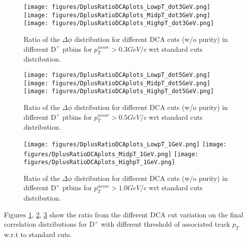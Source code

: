 \newpage
\begin{figure}[h]
\centering
{\texttt{[image: figures/DplusRatioDCAplots\_LowpT\_dot3GeV.png]}}
{\texttt{[image: figures/DplusRatioDCAplots\_MidpT\_dot3GeV.png]}}
{\texttt{[image: figures/DplusRatioDCAplots\_HighpT\_dot3GeV.png]}}
 \caption{Ratio of the $\Delta\phi$ distribution for different DCA cuts (w/o purity) in different $\text{D}^+$ ptbins for $p_{T}^{assoc}>0.3 GeV/c$ wrt standard cuts distribution. }
\label{fig:Syst_RDPlusDCAdot3GeV}
\end{figure}
\begin{figure}[h]
\centering
{\texttt{[image: figures/DplusRatioDCAplots\_LowpT\_dot5GeV.png]}}
{\texttt{[image: figures/DplusRatioDCAplots\_MidpT\_dot5GeV.png]}}
{\texttt{[image: figures/DplusRatioDCAplots\_HighpT\_dot5GeV.png]}}
 \caption{Ratio of the $\Delta\phi$ distribution for different DCA cuts (w/o purity) in different $\text{D}^+$ ptbins for $p_{T}^{assoc}>0.5 GeV/c$ wrt standard cuts distribution. }
\label{fig:Syst_RDPlusDCAdot5GeV}
\end{figure}
\begin{figure}[h]
\centering
{\texttt{[image: figures/DplusRatioDCAplots\_LowpT\_1GeV.png]}}
{\texttt{[image: figures/DplusRatioDCAplots\_MidpT\_1GeV.png]}}
{\texttt{[image: figures/DplusRatioDCAplots\_HighpT\_1GeV.png]}}
\caption{Ratio of the $\Delta\phi$ distribution for different DCA cuts (w/o purity) in different $\text{D}^+$ ptbins for $p_{T}^{assoc}>1.0 GeV/c$ wrt standard cuts distribution. }
\label{fig:Syst_RDPlusDCAt1GeV}
\end{figure}

Figures \ref{fig:Syst_RDPlusDCAdot3GeV}, \ref{fig:Syst_RDPlusDCAdot5GeV}, \ref{fig:Syst_RDPlusDCAt1GeV} show the ratio from the different DCA cut variation on the final correlation distributions for $\text{D}^+$ with different threshold of associated track $p_{T}$ w.r.t to standard cuts.



\newpage





